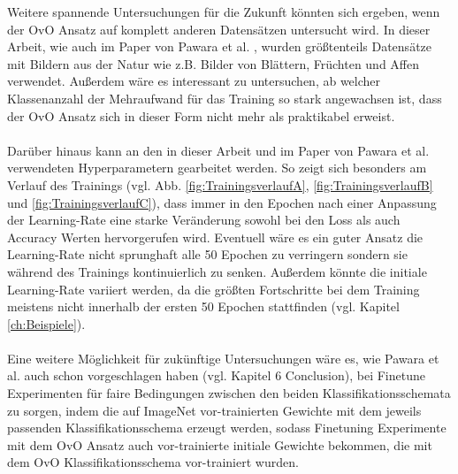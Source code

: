 \newpage

Weitere spannende Untersuchungen für die Zukunft könnten sich ergeben, wenn der OvO Ansatz auf komplett anderen Datensätzen untersucht wird. In dieser Arbeit, wie auch im Paper von Pawara et al. \cite{pawaraPaper}, wurden größtenteils Datensätze mit Bildern aus der Natur wie z.B. Bilder von Blättern, Früchten und Affen verwendet. Außerdem wäre es interessant zu untersuchen, ab welcher Klassenanzahl der Mehraufwand für das Training so stark angewachsen ist, dass der OvO Ansatz sich in dieser Form nicht mehr als praktikabel erweist.\\\\

Darüber hinaus kann an den in dieser Arbeit und im Paper von Pawara et al. \cite{pawaraPaper} verwendeten Hyperparametern gearbeitet werden. So zeigt sich besonders am Verlauf des Trainings (vgl. Abb. \ref{fig:TrainingsverlaufA}, \ref{fig:TrainingsverlaufB} und \ref{fig:TrainingsverlaufC}), dass immer in den Epochen nach einer Anpassung der Learning-Rate eine starke Veränderung sowohl bei den Loss als auch Accuracy Werten hervorgerufen wird. Eventuell wäre es ein guter Ansatz die Learning-Rate nicht sprunghaft alle 50 Epochen zu verringern sondern sie während des Trainings kontinuierlich zu senken. Außerdem könnte die initiale Learning-Rate variiert werden, da die größten Fortschritte bei dem Training meistens nicht innerhalb der ersten 50 Epochen stattfinden (vgl. Kapitel \ref{ch:Beispiele}).\\\\

Eine weitere Möglichkeit für zukünftige Untersuchungen wäre es, wie Pawara et al. auch schon vorgeschlagen haben (vgl. \cite{pawaraPaper} Kapitel 6 Conclusion), bei Finetune Experimenten für faire Bedingungen zwischen den beiden Klassifikationsschemata zu sorgen, indem die auf ImageNet \cite{imagenet} vor-trainierten Gewichte mit dem jeweils passenden Klassifikationsschema erzeugt werden, sodass Finetuning Experimente mit dem OvO Ansatz auch vor-trainierte initiale Gewichte bekommen, die mit dem OvO Klassifikationsschema vor-trainiert wurden.

